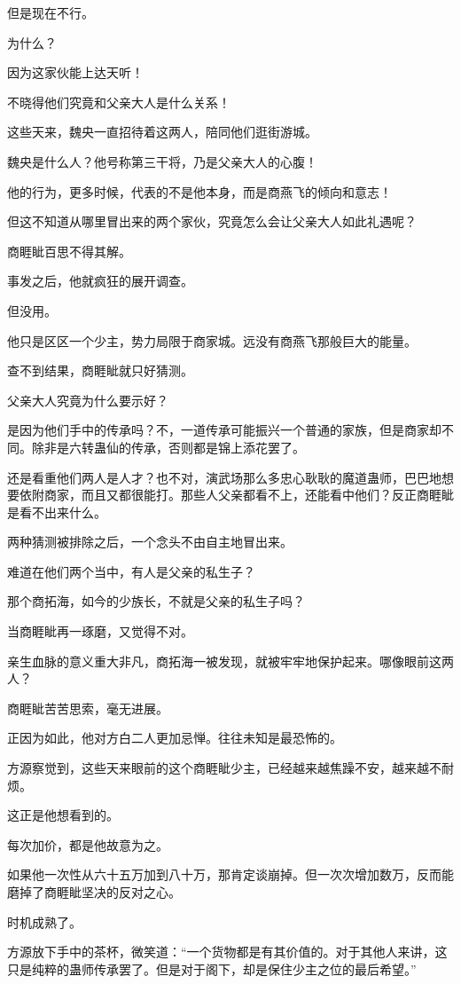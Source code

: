 \begin{this_body}
但是现在不行。

为什么？

因为这家伙能上达天听！

不晓得他们究竟和父亲大人是什么关系！

这些天来，魏央一直招待着这两人，陪同他们逛街游城。

魏央是什么人？他号称第三干将，乃是父亲大人的心腹！

他的行为，更多时候，代表的不是他本身，而是商燕飞的倾向和意志！

但这不知道从哪里冒出来的两个家伙，究竟怎么会让父亲大人如此礼遇呢？

商睚眦百思不得其解。

事发之后，他就疯狂的展开调查。

但没用。

他只是区区一个少主，势力局限于商家城。远没有商燕飞那般巨大的能量。

查不到结果，商睚眦就只好猜测。

父亲大人究竟为什么要示好？

是因为他们手中的传承吗？不，一道传承可能振兴一个普通的家族，但是商家却不同。除非是六转蛊仙的传承，否则都是锦上添花罢了。

还是看重他们两人是人才？也不对，演武场那么多忠心耿耿的魔道蛊师，巴巴地想要依附商家，而且又都很能打。那些人父亲都看不上，还能看中他们？反正商睚眦是看不出来什么。

两种猜测被排除之后，一个念头不由自主地冒出来。

难道在他们两个当中，有人是父亲的私生子？

那个商拓海，如今的少族长，不就是父亲的私生子吗？

当商睚眦再一琢磨，又觉得不对。

亲生血脉的意义重大非凡，商拓海一被发现，就被牢牢地保护起来。哪像眼前这两人？

商睚眦苦苦思索，毫无进展。

正因为如此，他对方白二人更加忌惮。往往未知是最恐怖的。

方源察觉到，这些天来眼前的这个商睚眦少主，已经越来越焦躁不安，越来越不耐烦。

这正是他想看到的。

每次加价，都是他故意为之。

如果他一次性从六十五万加到八十万，那肯定谈崩掉。但一次次增加数万，反而能磨掉了商睚眦坚决的反对之心。

时机成熟了。

方源放下手中的茶杯，微笑道：“一个货物都是有其价值的。对于其他人来讲，这只是纯粹的蛊师传承罢了。但是对于阁下，却是保住少主之位的最后希望。”


\end{this_body}

